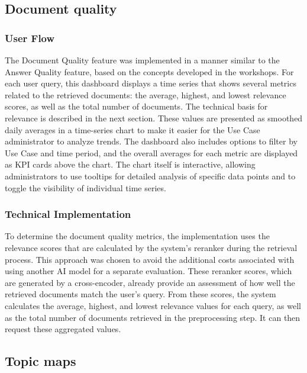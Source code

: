 \documentclass[
	english,
	ruledheaders=section,%
	class=report,%
	thesis={type=bachelor},%
	accentcolor=1b,%
	custommargins=true,%
	marginpar=false,%
	parskip=half-,%
	fontsize=11pt,%
	DIV=14,
]{tudapub}
\begin{document}
\subsection{Document quality}
\subsubsection{User Flow}
The Document Quality feature was implemented in a manner similar to the Answer Quality feature, based on the concepts developed in the workshops. For each user query, this dashboard displays a time series that shows several metrics related to the retrieved documents: the average, highest, and lowest relevance scores, as well as the total number of documents. The technical basis for relevance is described in the next section. These values are presented as smoothed daily averages in a time-series chart to make it easier for the Use Case administrator to analyze trends. The dashboard also includes options to filter by Use Case and time period, and the overall averages for each metric are displayed as KPI cards above the chart. The chart itself is interactive, allowing administrators to use tooltips for detailed analysis of specific data points and to toggle the visibility of individual time series.

\subsubsection{Technical Implementation}
To determine the document quality metrics, the implementation uses the relevance scores that are calculated by the system's reranker during the retrieval process. This approach was chosen to avoid the additional costs associated with using another AI model for a separate evaluation. These reranker scores, which are generated by a cross-encoder, already provide an assessment of how well the retrieved documents match the user's query. From these scores, the system calculates the average, highest, and lowest relevance values for each query, as well as the total number of documents retrieved in the preprocessing step. It can then request these aggregated values.
\subsection{Topic maps}
\end{document}
